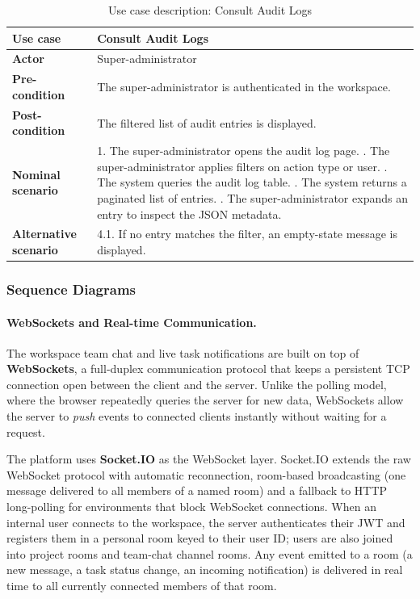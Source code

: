 \begin{table}[H]
\centering
\caption{Use case description: Consult Audit Logs}
\label{tab:uc_audit}
\renewcommand{\arraystretch}{1.3}
\begin{tabularx}{\textwidth}{|L{3.2cm}|X|}
\hline
\textbf{Use case} & Consult Audit Logs \\
\hline
\textbf{Actor} & Super-administrator \\
\hline
\textbf{Pre-condition} & The super-administrator is authenticated in the workspace. \\
\hline
\textbf{Post-condition} & The filtered list of audit entries is displayed. \\
\hline
\textbf{Nominal scenario} &
1. The super-administrator opens the audit log page. . The super-administrator applies filters on action type or user. . The system queries the audit log table. . The system returns a paginated list of entries. . The super-administrator expands an entry to inspect the JSON metadata. \\
\hline
\textbf{Alternative scenario} &
4.1. If no entry matches the filter, an empty-state message is displayed. \\
\hline
\end{tabularx}
\end{table}

\subsubsection{Sequence Diagrams}

\paragraph{WebSockets and Real-time Communication.}
The workspace team chat and live task notifications are built on top of \textbf{WebSockets}, a full-duplex communication protocol that keeps a persistent TCP connection open between the client and the server. Unlike the polling model, where the browser repeatedly queries the server for new data, WebSockets allow the server to \emph{push} events to connected clients instantly without waiting for a request.

The platform uses \textbf{Socket.IO} as the WebSocket layer. Socket.IO extends the raw WebSocket protocol with automatic reconnection, room-based broadcasting (one message delivered to all members of a named room) and a fallback to HTTP long-polling for environments that block WebSocket connections. When an internal user connects to the workspace, the server authenticates their JWT and registers them in a personal room keyed to their user ID; users are also joined into project rooms and team-chat channel rooms. Any event emitted to a room (a new message, a task status change, an incoming notification) is delivered in real time to all currently connected members of that room.

